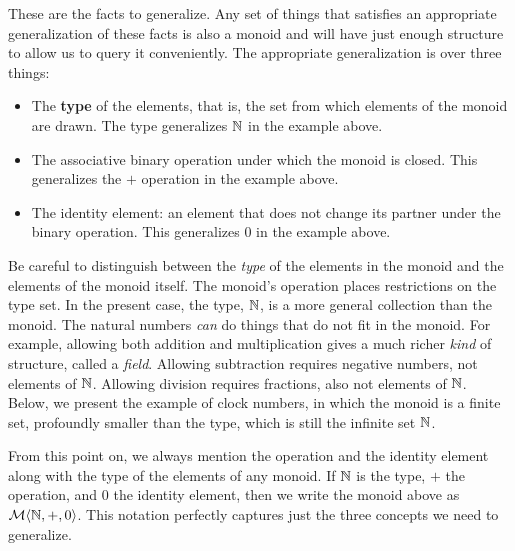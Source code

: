 These are the facts to generalize. Any set of things that satisfies an appropriate generalization of these facts is also a monoid and will have just enough structure to allow us to query it conveniently. The appropriate generalization is over three things: 
\begin{itemize}
	\item The \textbf{type} of the elements, that is, the set from which elements of the monoid are drawn. The type generalizes $\mathbb{N}$ in the example above.
	\item The associative binary operation under which the monoid is closed. This generalizes the $+$ operation in the example above.
	\item The identity element: an element that does not change its partner under the binary operation. This generalizes 0 in the example above.
\end{itemize}


Be careful to distinguish between the \emph{type} of the elements in the monoid and the elements of the monoid itself. The monoid's operation places restrictions on the type set. In the present case, the type, $\mathbb{N}$, is a more general collection than the monoid. The natural numbers \emph{can} do things that do not fit in the monoid. For example, allowing both addition and multiplication gives a much richer \emph{kind} of structure, called a \emph{field}. Allowing subtraction requires negative numbers, not elements of $\mathbb{N}$. Allowing division requires fractions, also not elements of $\mathbb{N}$. Below, we present the example of clock numbers, in which the monoid is a finite set, profoundly smaller than the type, which is still the infinite set $\mathbb{N}$. 


From this point on, we always mention the operation and the identity element along with the type of the elements of any monoid. If $\mathbb{N}$ is the type, $+$ the operation, and $0$ the identity element, then we write the monoid above as $\mathcal{M}\langle{\mathbb{N}},{+},{0}\rangle$. This notation perfectly captures just the three concepts we need to generalize.


